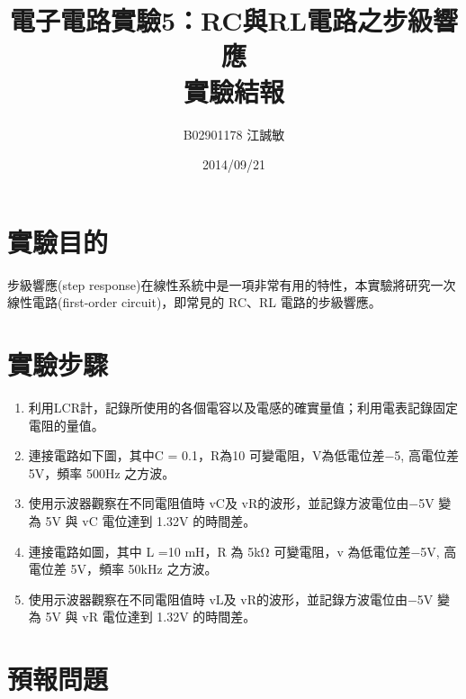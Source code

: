 \documentclass[12pt, a4paper]{article}
\title{ \bf {\huge 電子電路實驗5：RC與RL電路之步級響應}\\ 實驗結報}
\author{B02901178 江誠敏}
\date{2014/09/21}
\begin{document}
\maketitle

\section{實驗目的}
步級響應(step response)在線性系統中是一項非常有用的特性，本實驗將研究一次線性電路(first-order circuit)，即常見的 RC、RL 電路的步級響應。
\section{實驗步驟}
\begin{enumerate}[itemsep=0pt]
  \item 利用LCR計，記錄所使用的各個電容以及電感的確實量值；利用電表記錄固定電阻的量值。
  \item 連接電路如下圖，其中C = 0.1，R為10 可變電阻，V為低電位差−5, 高電位差5V，頻率 500Hz 之方波。
  \item 使用示波器觀察在不同電阻值時 vC及 vR的波形，並記錄方波電位由−5V 變為 5V 與 vC
    電位達到 1.32V 的時間差。
  \item 連接電路如圖，其中 L =10 mH，R 為 5kΩ 可變電阻，v 為低電位差−5V, 高電位差
    5V，頻率 50kHz 之方波。
  \item 使用示波器觀察在不同電阻值時 vL及 vR的波形，並記錄方波電位由−5V 變為 5V 與 vR
    電位達到 1.32V 的時間差。
\end{enumerate}


  \begin{center}
    \quad
  \end{center}


  \section{預報問題}
\end{document}
